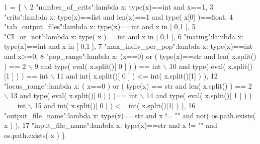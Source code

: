 \begin{DoxyCode}
1 = \{ \(\backslash\)
2                 \textcolor{stringliteral}{"number\_of\_crits"}:\textcolor{keyword}{lambda} x: type(x)==int \textcolor{keywordflow}{and} x==1,
3                 \textcolor{stringliteral}{"crits"}:\textcolor{keyword}{lambda} x: type(x)==list \textcolor{keywordflow}{and} len(x)==1 \textcolor{keywordflow}{and} type( x[0] )==float,
4                 \textcolor{stringliteral}{"tab\_output\_files"}:\textcolor{keyword}{lambda} x: type(x)==int \textcolor{keywordflow}{and} x \textcolor{keywordflow}{in} [ 0,1 ],
5                 \textcolor{stringliteral}{"CI\_or\_not"}:\textcolor{keyword}{lambda} x: type( x )==int \textcolor{keywordflow}{and} x \textcolor{keywordflow}{in} [ 0,1 ],
6                 \textcolor{stringliteral}{"mating"}:\textcolor{keyword}{lambda} x: type(x)==int \textcolor{keywordflow}{and} x \textcolor{keywordflow}{in} [ 0,1 ],
7                 \textcolor{stringliteral}{"max\_indiv\_per\_pop"}:\textcolor{keyword}{lambda} x: type(x)==int \textcolor{keywordflow}{and} x>=0,
8                 \textcolor{stringliteral}{"pop\_range"}:\textcolor{keyword}{lambda} x: (x==0) \textcolor{keywordflow}{or} ( type(x)==str \textcolor{keywordflow}{and} len( x.split() ) == 2 \(\backslash\)
9                                     \textcolor{keywordflow}{and} type( eval( x.split()[ 0 ] ) ) == int \(\backslash\)
10                                     \textcolor{keywordflow}{and} type( eval( x.split()[1 ] ) ) == int \(\backslash\)
11                                     \textcolor{keywordflow}{and} int( x.split()[ 0 ] ) <= int( x.split()[1] ) ),
12                 \textcolor{stringliteral}{"locus\_range"}:\textcolor{keyword}{lambda} x: ( x==0 ) \textcolor{keywordflow}{or} ( type(x) == str \textcolor{keywordflow}{and} len( x.split() ) == 2 \(\backslash\)
13                                     \textcolor{keywordflow}{and} type( eval( x.split()[ 0 ] ) )== int \(\backslash\)
14                                     \textcolor{keywordflow}{and} type( eval( x.split()[ 1 ] ) ) == int \(\backslash\)
15                                     \textcolor{keywordflow}{and} int( x.split()[ 0 ] ) <= int( x.split()[1] ) ),
16                 \textcolor{stringliteral}{"output\_file\_name"}:\textcolor{keyword}{lambda} x: type(x)==str \textcolor{keywordflow}{and} x != \textcolor{stringliteral}{""} \textcolor{keywordflow}{and} not( os.path.exists( x ) ),
17                 \textcolor{stringliteral}{"input\_file\_name"}:\textcolor{keyword}{lambda} x: type(x)==str \textcolor{keywordflow}{and} x != \textcolor{stringliteral}{""} \textcolor{keywordflow}{and} os.path.exists( x ) \}
\end{DoxyCode}


